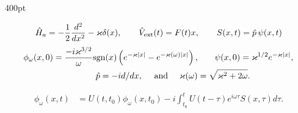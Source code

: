 \begin{frame}
\begin{textblock*}{400pt}
\begin{itemize}
\begin{equation}
  \hat{H}_a = -\frac{1}{2}\frac{d^2}{dx^2} - \varkappa\delta(x), 
	\hspace{20pt}  \hat{V}_{\rm ext}(t) = F(t)x, \hspace{20pt}
	S(x,t) = \hat{p}\,\psi(x,t)
\end{equation}
\begin{align}
  \phi_\omega (x,0) = \frac{-i\varkappa^{3/2}}{\omega}
	{\rm sgn}(x)\left(e^{-\varkappa|x|} - e^{-\varkappa(\omega)|x|}\right), &
\hspace{20pt}  \psi(x,0) = \varkappa^{1/2}e^{-\varkappa|x|}, 
\label{eqn:bound_state0} \\
	\hat{p} = -id/dx,\hspace{10pt}  \mbox{ and } 
	\hspace{10pt} \varkappa(\omega) & = \sqrt{\varkappa^2 + 2\omega}.
\end{align}

\begin{align}
        \phi_\omega(x,t) & = U(t,t_0)\phi_\omega(x,t_0)
          -i\int_{t_0}^tU(t-\tau)e^{i\omega \tau}S(x,\tau)d\tau. \label{eqn:duhamel}
\end{align}




\end{itemize}
\end{textblock*}
\end{frame}
